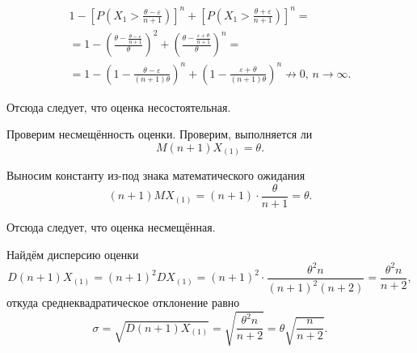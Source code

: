 \begin{enumerate}[label=\alph*)]
\begin{equation*}
\begin{split}
      1 - \left[ P \left( X_1 > \frac{ \theta - \varepsilon }{n + 1} \right) \right]^n +
      \left[ P \left( X_1 > \frac{ \theta + \varepsilon}{n + 1} \right) \right]^n = \\
      = 1 - \left( \frac{ \theta - \frac{ \theta - \varepsilon }{n + 1}}{ \theta } \right)^2 +
      \left( \frac{ \theta - \frac{ \varepsilon + \theta }{ n + 1}}{ \theta } \right)^n = \\
      = 1 - \left( 1 - \frac{ \theta - \varepsilon }{ \left( n + 1 \right) \theta } \right)^n +
      \left( 1 - \frac{ \varepsilon + \theta }{ \left( n + 1 \right) \theta } \right)^n \not \to
      0, \, n \to \infty.
    \end{split}
  \end{equation*}

  Отсюда следует, что оценка несостоятельная.

  Проверим несмещённость оценки.
  Проверим, выполняется ли
  $$M \left( n + 1 \right) X_{ \left( 1 \right) } =
    \theta.$$

  Выносим константу из-под знака математического ожидания
  $$ \left( n + 1 \right) MX_{ \left( 1 \right) } =
    \left( n + 1 \right) \cdot \frac{ \theta }{n + 1} =
    \theta.$$

  Отсюда следует, что оценка несмещённая.

  Найдём дисперсию оценки
  $$D \left( n + 1 \right) X_{ \left( 1 \right) } =
    \left( n + 1 \right)^2 DX_{ \left( 1 \right) } =
    \left( n + 1 \right)^2 \cdot \frac{ \theta^2 n}{ \left( n + 1 \right)^2 \left( n + 2 \right) } =
    \frac{ \theta^2 n}{n + 2},$$
  откуда среднеквадратическое отклонение равно
  $$ \sigma =
    \sqrt{D \left( n + 1 \right) X_{ \left( 1 \right) }} =
    \sqrt{ \frac{ \theta^2 n}{n + 2}} =
    \theta \sqrt{ \frac{n}{n + 2}}.$$
\end{enumerate}
